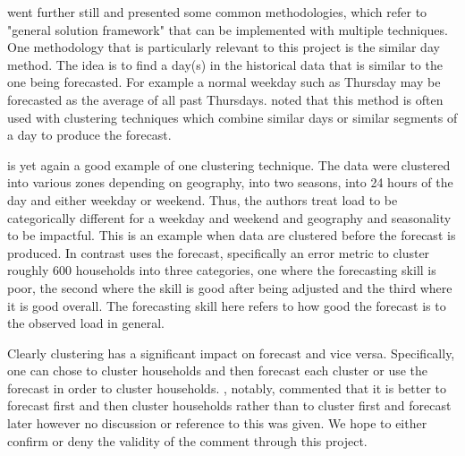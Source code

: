 \documentclass[a4paper]{article}
\begin{document}
\cite{hong16} went further still and presented some common methodologies, which refer to "general solution framework" that can be implemented with multiple techniques. One methodology that is particularly relevant to this project is the similar day method. The idea is to find a day(s) in the historical data that is similar to the one being forecasted. For example a normal weekday such as Thursday may be forecasted as the average of all past Thursdays. \cite{hong16} noted that this method is often used with clustering techniques which combine similar days or similar segments of a day to produce the forecast.

\cite{char14} is yet again a good example of one clustering technique. The data were clustered into various zones depending on geography, into two seasons, into 24 hours of the day and either weekday or weekend. Thus, the authors treat load to be categorically different for a weekday and weekend and geography and seasonality to be impactful. This is an example when data are clustered before the forecast is produced. In contrast \cite{dan14} uses the forecast, specifically an error metric to cluster roughly 600 households into three categories, one where the forecasting skill is poor, the second where the skill is good after being adjusted and the third where it is good overall. The forecasting skill here refers to how good the forecast is to the observed load in general.

Clearly clustering has a significant impact on forecast and vice versa. Specifically, one can chose to cluster households and then forecast each cluster or use the forecast in order to cluster households. \cite{char14}, notably, commented that it is better to forecast first and then cluster households rather than to cluster first and forecast later however no discussion or reference to this was given.  We hope to either confirm or deny the validity of the comment through this project.
\end{document}
